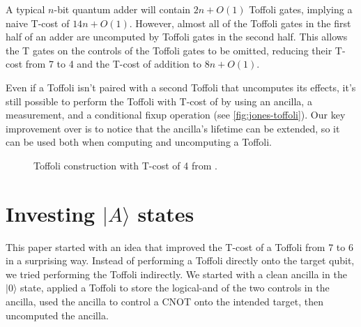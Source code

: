 \documentclass[twocolumn,longbibliography]{quantumarticle-customized}
\newcommand{\qH}{\gate{H}}
\newcommand{\qT}{\gate{T}}
\newcommand{\qTi}{\gate{T^\dagger}}
\newcommand{\qSi}{\gate{S^\dagger}}
\newcommand{\qO}{\lstick{|0\rangle}}
\begin{document}
A typical $n$-bit quantum adder will contain $2n + O(1)$ Toffoli gates, implying a naive T-cost of $14n + O(1)$.
However, almost all of the Toffoli gates in the first half of an adder are uncomputed by Toffoli gates in the second half.
This allows the T gates on the controls of the Toffoli gates to be omitted, reducing their T-cost from 7 to 4 and the T-cost of addition to $8n + O(1)$.

Even if a Toffoli isn't paired with a second Toffoli that uncomputes its effects, it's still possible to perform the Toffoli with T-cost of by using an ancilla, a measurement, and a conditional fixup operation \cite{Jones2013} (see \autoref{fig:jones-toffoli}).
Our key improvement over \cite{Jones2013} is to notice that the ancilla's lifetime can be extended, so it can be used both when computing and uncomputing a Toffoli.

\begin{figure}
  \resizebox{\linewidth}{!}{
    \Qcircuit @R=1.5em @C=0.7em {
      &\ctrl{1} &\qw & &   & & &     &\qw &\qw &\qw      &\qw  &\ctrl{3} &\qw &\qw      &\qw  &\qw &\qw  &\qw       &\qw &\qw    &\ctrl{1}       &\qw \\
      &\ctrl{1} &\qw & & = & & &     &\qw &\qw &\ctrl{2} &\qw  &\qw      &\qw &\ctrl{2} &\qw  &\qw &\qw  &\qw       &\qw &\qw    &\gate{Z}       &\qw \\
      &\targ    &\qw & &   & & &     &\qw &\qw &\qw      &\qw  &\qw      &\qw &\qw      &\qw  &\qw &\qw  &\targ     &\qw &\qw    &\qw\cwx        &\qw \\
      &         &    & &   & & & \qO &\qH &\qT &\targ    &\qTi &\targ    &\qT &\targ    &\qTi &\qH &\qSi &\ctrl{-1} &\qH &\meter &\cw\cwx\bullet & \\
    }
  }
  \caption{
	Toffoli construction with T-cost of 4 from \cite{Jones2013}.
  }
  \label{fig:jones-toffoli}
\end{figure}


\section{Investing $|A\rangle$ states}
\label{sec:invest}

This paper started with an idea that improved the T-cost of a Toffoli from 7 to 6 in a surprising way.
Instead of performing a Toffoli directly onto the target qubit, we tried performing the Toffoli indirectly.
We started with a clean ancilla in the $|0\rangle$ state, applied a Toffoli to store the logical-and of the two controls in the ancilla, used the ancilla to control a CNOT onto the intended target, then uncomputed the ancilla.
\end{document}
